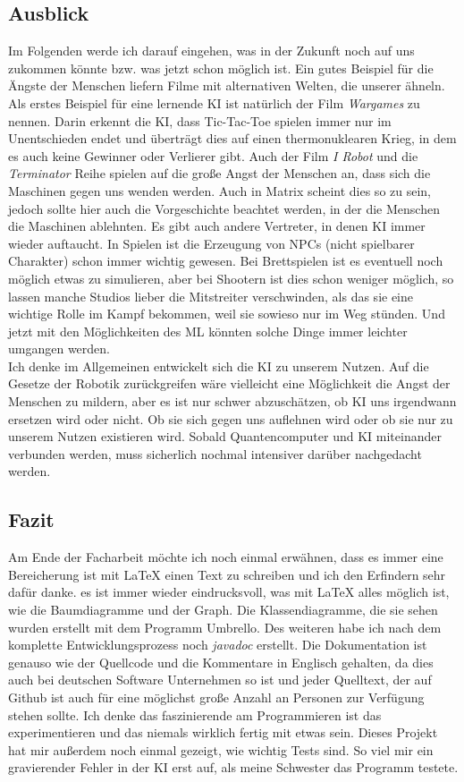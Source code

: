\documentclass[12pt,a4paper]{article}
\begin{document}
	\subsection{Ausblick}
	Im Folgenden werde ich darauf eingehen, was in der Zukunft noch auf uns zukommen könnte bzw. was jetzt schon möglich ist. Ein gutes Beispiel für die Ängste der Menschen liefern Filme mit alternativen Welten, die unserer ähneln. Als erstes Beispiel für eine lernende KI ist natürlich der Film \textit{Wargames} zu nennen. Darin erkennt die KI, dass Tic-Tac-Toe spielen immer nur im Unentschieden endet und überträgt dies auf einen thermonuklearen Krieg, in dem es auch keine Gewinner oder Verlierer gibt. Auch der Film \textit{I Robot} und die \textit{Terminator} Reihe spielen auf die große Angst der Menschen an, dass sich die Maschinen gegen uns wenden werden. Auch in Matrix scheint dies so zu sein, jedoch sollte hier auch die Vorgeschichte beachtet werden, in der die Menschen die Maschinen ablehnten. Es gibt auch andere Vertreter, in denen KI immer wieder auftaucht. In Spielen ist die Erzeugung von NPCs (nicht spielbarer Charakter) schon immer wichtig gewesen. Bei Brettspielen ist es eventuell noch möglich etwas zu simulieren, aber bei Shootern ist dies schon weniger möglich, so lassen manche Studios lieber die Mitstreiter verschwinden, als das sie eine wichtige Rolle im Kampf bekommen, weil sie sowieso nur im Weg stünden. Und jetzt mit den Möglichkeiten des ML könnten solche Dinge immer leichter umgangen werden.\\
	Ich denke im Allgemeinen entwickelt sich die KI zu unserem Nutzen. Auf die Gesetze der Robotik zurückgreifen wäre vielleicht eine Möglichkeit die Angst der Menschen zu mildern, aber es ist nur schwer abzuschätzen, ob KI uns irgendwann ersetzen wird oder nicht. Ob sie sich gegen uns auflehnen wird oder ob sie nur zu unserem Nutzen existieren wird. Sobald Quantencomputer und KI miteinander verbunden werden, muss sicherlich nochmal intensiver darüber nachgedacht werden.
	\subsection{Fazit}
	Am Ende der Facharbeit möchte ich noch einmal erwähnen, dass es immer eine Bereicherung ist mit \LaTeX{} einen Text zu schreiben und ich den Erfindern sehr dafür danke. es ist immer wieder eindrucksvoll, was mit \LaTeX{} alles möglich ist, wie die Baumdiagramme und der Graph. Die Klassendiagramme, die sie sehen wurden erstellt mit dem Programm \glqq Umbrello\grqq{}. Des weiteren habe ich nach dem komplette Entwicklungsprozess noch \textit{javadoc} erstellt. Die Dokumentation ist genauso wie der Quellcode und die Kommentare in Englisch gehalten, da dies auch bei deutschen Software Unternehmen so ist und jeder Quelltext, der auf Github ist auch für eine möglichst große Anzahl an Personen zur Verfügung stehen sollte. Ich denke das faszinierende am Programmieren ist das experimentieren und das niemals wirklich fertig mit etwas sein. Dieses Projekt hat mir außerdem noch einmal gezeigt, wie wichtig Tests sind. So viel mir ein gravierender Fehler in der KI erst auf, als meine Schwester das Programm testete.
\end{document}
